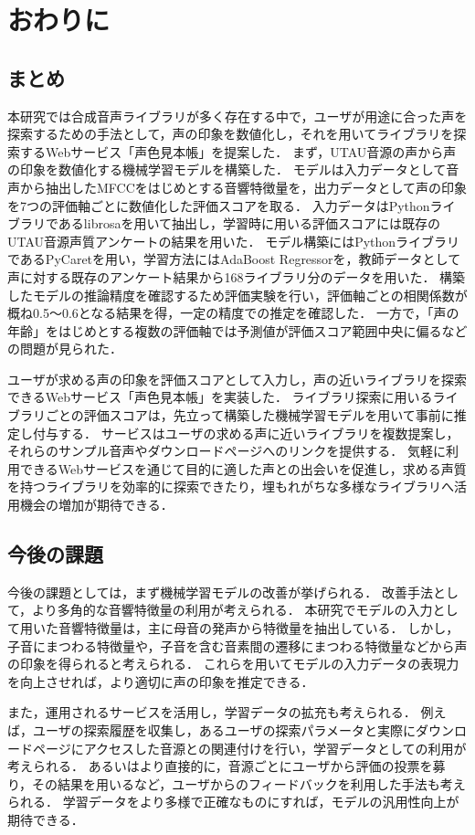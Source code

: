 \chapter{おわりに}
\thispagestyle{myheadings}

\section{まとめ}
本研究では合成音声ライブラリが多く存在する中で，ユーザが用途に合った声を探索するための手法として，声の印象を数値化し，それを用いてライブラリを探索するWebサービス「声色見本帳」を提案した．
まず，UTAU音源の声から声の印象を数値化する機械学習モデルを構築した．
モデルは入力データとして音声から抽出したMFCCをはじめとする音響特徴量を，出力データとして声の印象を7つの評価軸ごとに数値化した評価スコアを取る．
入力データはPythonライブラリであるlibrosaを用いて抽出し，学習時に用いる評価スコアには既存のUTAU音源声質アンケートの結果を用いた．
モデル構築にはPythonライブラリであるPyCaretを用い，学習方法にはAdaBoost Regressorを，教師データとして声に対する既存のアンケート結果から168ライブラリ分のデータを用いた．
構築したモデルの推論精度を確認するため評価実験を行い，評価軸ごとの相関係数が概ね0.5〜0.6となる結果を得，一定の精度での推定を確認した．
一方で，「声の年齢」をはじめとする複数の評価軸では予測値が評価スコア範囲中央に偏るなどの問題が見られた．

ユーザが求める声の印象を評価スコアとして入力し，声の近いライブラリを探索できるWebサービス「声色見本帳」を実装した．
ライブラリ探索に用いるライブラリごとの評価スコアは，先立って構築した機械学習モデルを用いて事前に推定し付与する．
サービスはユーザの求める声に近いライブラリを複数提案し，それらのサンプル音声やダウンロードページへのリンクを提供する．
気軽に利用できるWebサービスを通じて目的に適した声との出会いを促進し，求める声質を持つライブラリを効率的に探索できたり，埋もれがちな多様なライブラリへ活用機会の増加が期待できる．

\section{今後の課題}
今後の課題としては，まず機械学習モデルの改善が挙げられる．
改善手法として，より多角的な音響特徴量の利用が考えられる．
本研究でモデルの入力として用いた音響特徴量は，主に母音の発声から特徴量を抽出している．
しかし，子音にまつわる特徴量や，子音を含む音素間の遷移にまつわる特徴量などから声の印象を得られると考えられる．
これらを用いてモデルの入力データの表現力を向上させれば，より適切に声の印象を推定できる．

また，運用されるサービスを活用し，学習データの拡充も考えられる．
例えば，ユーザの探索履歴を収集し，あるユーザの探索パラメータと実際にダウンロードページにアクセスした音源との関連付けを行い，学習データとしての利用が考えられる．
あるいはより直接的に，音源ごとにユーザから評価の投票を募り，その結果を用いるなど，ユーザからのフィードバックを利用した手法も考えられる．
学習データをより多様で正確なものにすれば，モデルの汎用性向上が期待できる．

